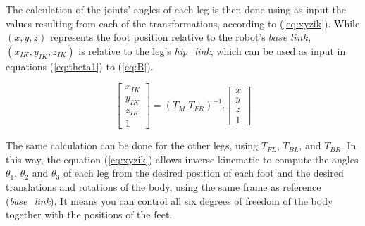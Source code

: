 \documentclass[conference]{IEEEtran}
\begin{document}

The calculation of the joints' angles of each leg is then done using as input the values resulting from each of the transformations, according to (\ref{eq:xyzik}). While $(x, y, z)$ represents the foot position relative to the robot's $base\_link$, $(x_{IK}, y_{IK}, z_{IK})$ is relative to the leg's \textit{hip\_link}, which can be used as input in equations (\ref{eq:theta1}) to (\ref{eq:B}). 


\begin{equation}
  \label{eq:xyzik}
  \begin{bmatrix}
    x_{IK} \\
    y_{IK} \\
    z_{IK} \\
    1
  \end{bmatrix}= (T_M.T_{FR})^{-1}.
  \begin{bmatrix}
    x \\
    y \\
    z \\
    1
  \end{bmatrix}
\end{equation}

The same calculation can be done for the other legs, using $T_{FL}$, $T_{BL}$, and $T_{BR}$. In this way, the equation (\ref{eq:xyzik}) allows inverse kinematic to compute the angles $\theta_1$, $\theta_2$ and $\theta_3$ of each leg from the desired position of each foot and the desired translations and rotations of the body, using the same frame as reference (\textit{base\_link}). It means you can control all six degrees of freedom of the body together with the positions of the feet.
\end{document}
